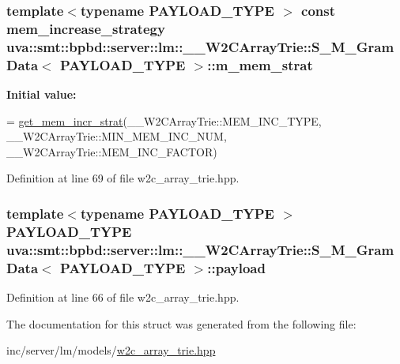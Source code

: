 \subsubsection[{m\+\_\+mem\+\_\+strat}]{\setlength{\rightskip}{0pt plus 5cm}template$<$typename P\+A\+Y\+L\+O\+A\+D\+\_\+\+T\+Y\+P\+E $>$ const {\bf mem\+\_\+increase\+\_\+strategy} {\bf uva\+::smt\+::bpbd\+::server\+::lm\+::\+\_\+\+\_\+\+W2\+C\+Array\+Trie\+::\+S\+\_\+\+M\+\_\+\+Gram\+Data}$<$ P\+A\+Y\+L\+O\+A\+D\+\_\+\+T\+Y\+P\+E $>$\+::m\+\_\+mem\+\_\+strat\hspace{0.3cm}{\ttfamily [static]}}\label{structuva_1_1smt_1_1bpbd_1_1server_1_1lm_1_1_____w2_c_array_trie_1_1_s___m___gram_data_ac63b204aef5900bbd9caf0aed3c62e23}
{\bfseries Initial value\+:}
\begin{DoxyCode}
=
                        \hyperlink{namespaceuva_1_1utils_1_1containers_a04ae8ecdaffa42ace76f1c604659ba6c}{get\_mem\_incr\_strat}(\_\_W2CArrayTrie::MEM\_INC\_TYPE,
                                \_\_W2CArrayTrie::MIN\_MEM\_INC\_NUM, \_\_W2CArrayTrie::MEM\_INC\_FACTOR)
\end{DoxyCode}


Definition at line 69 of file w2c\+\_\+array\+\_\+trie.\+hpp.

\hypertarget{structuva_1_1smt_1_1bpbd_1_1server_1_1lm_1_1_____w2_c_array_trie_1_1_s___m___gram_data_a623cb2bdb3aea0d0d9a88110271fe89b}{}
\subsubsection[{payload}]{\setlength{\rightskip}{0pt plus 5cm}template$<$typename P\+A\+Y\+L\+O\+A\+D\+\_\+\+T\+Y\+P\+E $>$ P\+A\+Y\+L\+O\+A\+D\+\_\+\+T\+Y\+P\+E {\bf uva\+::smt\+::bpbd\+::server\+::lm\+::\+\_\+\+\_\+\+W2\+C\+Array\+Trie\+::\+S\+\_\+\+M\+\_\+\+Gram\+Data}$<$ P\+A\+Y\+L\+O\+A\+D\+\_\+\+T\+Y\+P\+E $>$\+::payload}\label{structuva_1_1smt_1_1bpbd_1_1server_1_1lm_1_1_____w2_c_array_trie_1_1_s___m___gram_data_a623cb2bdb3aea0d0d9a88110271fe89b}


Definition at line 66 of file w2c\+\_\+array\+\_\+trie.\+hpp.



The documentation for this struct was generated from the following file\+:\begin{DoxyCompactItemize}
\item 
inc/server/lm/models/\hyperlink{w2c__array__trie_8hpp}{w2c\+\_\+array\+\_\+trie.\+hpp}\end{DoxyCompactItemize}
